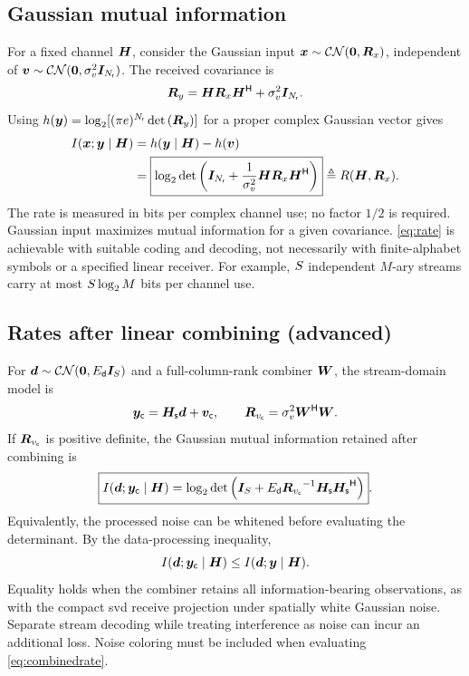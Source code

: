 \subsection{Gaussian mutual information}

For a fixed channel $\bm{H}$, consider the Gaussian input
$\bm{x}\sim\mathcal{CN}(\bm{0},\bm{R}_x)$, independent of
$\bm{v}\sim\mathcal{CN}(\bm{0},\sigma_v^2\bm{I}_{N_{\mathsf{r}}})$.
The received covariance is
\[
\bm{R}_y=\bm{H}\bm{R}_x{\bm{H}}^{\mathsf{H}}+\sigma_v^2\bm{I}_{N_{\mathsf{r}}}.
\]
Using $h(\bm{y})=\log_2[(\pi e)^{N_{\mathsf{r}}}\operatorname{det}\left(\bm{R}_y\right)]$ for a proper complex Gaussian vector gives 
\begin{align}
	I(\bm{x};\bm{y}\mid\bm{H})
	&=h(\bm{y}\mid\bm{H})-h(\bm{v})\nonumber\\
	&=\boxed{\log_2\operatorname{det}\left(\bm{I}_{N_{\mathsf{r}}}
			+\frac{1}{\sigma_v^2}\bm{H}\bm{R}_x{\bm{H}}^{\mathsf{H}}\right)}
	\triangleq R(\bm{H},\bm{R}_x).\label{eq:rate}
\end{align}
The rate is measured in bits per complex channel use; no factor $1/2$ is required. Gaussian input maximizes mutual information for a given covariance. \eqref{eq:rate} is achievable with suitable coding and decoding, not necessarily with finite-alphabet symbols or a specified linear receiver. For example, $S$ independent $M$-ary streams carry at most $S\log_2 M$ bits per channel use.

\subsection{Rates after linear combining (advanced)}

For $\bm{d}\sim\mathcal{CN}(\bm{0},E_{\mathsf{d}}\bm{I}_{S})$ and a full-column-rank combiner $\bm{W}$, the stream-domain model is
\[
\bm{y}_{\mathsf c}=\bm{H}_{\mathsf{s}}\bm{d}+\bm{v}_{\mathsf c},
\qquad
\bm{R}_{v_{\mathsf c}}=\sigma_v^2{\bm{W}}^{\mathsf{H}}\bm{W}.
\]
If $\bm{R}_{v_{\mathsf c}}$ is positive definite, the Gaussian mutual information retained after combining is
\begin{equation}\label{eq:combinedrate}
	\boxed{
		I(\bm{d};\bm{y}_{\mathsf c}\mid\bm{H})
		=\log_2\operatorname{det}\left(\bm{I}_{S}
			+E_{\mathsf{d}}{\bm{R}_{v_{\mathsf c}}}^{-1}\bm{H}_{\mathsf{s}}{\bm{H}_{\mathsf{s}}}^{\mathsf{H}}\right)}.
\end{equation}
Equivalently, the processed noise can be whitened before evaluating the determinant. By the data-processing inequality,
\[
I(\bm{d};\bm{y}_{\mathsf c}\mid\bm{H})
\leq I(\bm{d};\bm{y}\mid\bm{H}).
\]
Equality holds when the combiner retains all information-bearing observations, as with the compact \ac{svd} receive projection under spatially white Gaussian noise. Separate stream decoding while treating interference as noise can incur an additional loss. Noise coloring must be included when evaluating \eqref{eq:combinedrate}.

